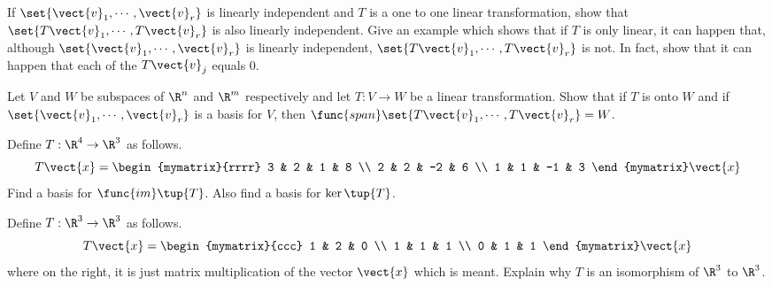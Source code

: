\begin{enumialphparenastyle}
\begin{ex}
\begin{sol}
\end{sol}
\end{ex}


\begin{ex} If $\set{\vect{v}_{1},\cdots ,\vect{v}_{r}} $ is linearly
independent and $T$ is a one to one linear transformation, show that $
\set{T\vect{v}_{1},\cdots ,T\vect{v}_{r}} $ is also linearly
independent. Give an example which shows that if $T$ is only linear, it can
happen that, although $\set{\vect{v}_{1},\cdots ,\vect{v}_{r}} $ is
linearly independent, $\set{T\vect{v}_{1},\cdots ,T\vect{v}_{r}} $
is not. In fact, show that it can happen that each of the $T\vect{v}_{j}$
equals 0.
\end{ex}


\begin{ex} Let $V$ and $W$ be subspaces of $\R^{n}$ and $\R^{m}$
respectively and let $T:V\rightarrow W$ be a linear transformation. Show
that if $T$ is onto $W$ and if $\set{\vect{v}_{1},\cdots ,\vect{v}
_{r}} $ is a basis for $V$, then $\func{span}\set{T\vect{v}
_{1},\cdots ,T\vect{v}_{r}} =W$.
\end{ex}


\begin{ex} Define $T:\R^{4}\rightarrow \R^{3}$ as follows. 
\begin{equation*}
T\vect{x}=\begin{mymatrix}{rrrr}
3 & 2 & 1 & 8 \\ 
2 & 2 & -2 & 6 \\ 
1 & 1 & -1 & 3
\end{mymatrix} \vect{x}
\end{equation*}
Find a basis for $\func{im}\tup{T} $. Also find a basis for $\ker
\tup{T} $.
\end{ex}


\begin{ex} Define $T:\R^{3}\rightarrow \R^{3}$ as follows. 
\begin{equation*}
T\vect{x}=\begin{mymatrix}{ccc}
1 & 2 & 0 \\ 
1 & 1 & 1 \\ 
0 & 1 & 1
\end{mymatrix} \vect{x}
\end{equation*}
where on the right, it is just matrix multiplication of the vector $\vect{x}$
which is meant. Explain why $T$ is an isomorphism of $\R^{3}$ to $
\R^{3}$.
\end{ex}



\end{enumialphparenastyle}
